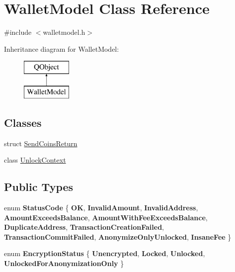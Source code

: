\hypertarget{class_wallet_model}{}\section{Wallet\+Model Class Reference}
\label{class_wallet_model}


{\ttfamily \#include $<$walletmodel.\+h$>$}

Inheritance diagram for Wallet\+Model\+:\begin{figure}[H]
\begin{center}
\leavevmode
\includegraphics[height=2.000000cm]{class_wallet_model}
\end{center}
\end{figure}
\subsection*{Classes}
\begin{DoxyCompactItemize}
\item 
struct \mbox{\hyperlink{struct_wallet_model_1_1_send_coins_return}{Send\+Coins\+Return}}
\item 
class \mbox{\hyperlink{class_wallet_model_1_1_unlock_context}{Unlock\+Context}}
\end{DoxyCompactItemize}
\subsection*{Public Types}
\begin{DoxyCompactItemize}
\item 
\mbox{\label{class_wallet_model_afb93f64411320dce4692c2190b7d35cc}} 
enum {\bfseries Status\+Code} \{ \newline
{\bfseries OK}, 
{\bfseries Invalid\+Amount}, 
{\bfseries Invalid\+Address}, 
{\bfseries Amount\+Exceeds\+Balance}, 
\newline
{\bfseries Amount\+With\+Fee\+Exceeds\+Balance}, 
{\bfseries Duplicate\+Address}, 
{\bfseries Transaction\+Creation\+Failed}, 
{\bfseries Transaction\+Commit\+Failed}, 
\newline
{\bfseries Anonymize\+Only\+Unlocked}, 
{\bfseries Insane\+Fee}
 \}
\item 
\mbox{\label{class_wallet_model_a58f6f0bb5a7b8b4e4d0812185ccc0616}} 
enum {\bfseries Encryption\+Status} \{ {\bfseries Unencrypted}, 
{\bfseries Locked}, 
{\bfseries Unlocked}, 
{\bfseries Unlocked\+For\+Anonymization\+Only}
 \}
\end{DoxyCompactItemize}
